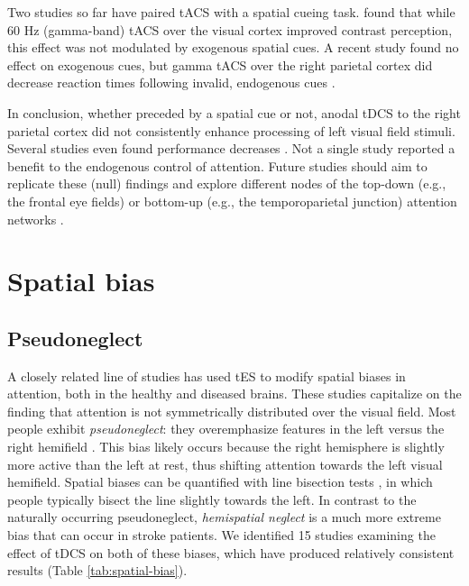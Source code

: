 \documentclass[11pt,]{memoir}
\begin{document}
Two studies so far have paired tACS with a spatial cueing task. \textcite{Laczo2012} found that while 60 Hz (gamma-band) tACS over the visual cortex improved contrast perception, this effect was not modulated by exogenous spatial cues. A recent study found no effect on exogenous cues, but gamma tACS over the right parietal cortex did decrease reaction times following invalid, endogenous cues \autocite{Hopfinger2016}.

In conclusion, whether preceded by a spatial cue or not, anodal tDCS to the right parietal cortex did not consistently enhance processing of left visual field stimuli. Several studies even found performance decreases \autocites{Filmer2015}{Learmonth2015}. Not a single study reported a benefit to the endogenous control of attention. Future studies should aim to replicate these (null) findings and explore different nodes of the top-down (e.g., the frontal eye fields) or bottom-up (e.g., the temporoparietal junction) attention networks \autocite{Corbetta2002}.

\hypertarget{spatial-bias}{%
\section{Spatial bias}\label{spatial-bias}}

\hypertarget{pseudoneglect}{%
\subsection{Pseudoneglect}\label{pseudoneglect}}

A closely related line of studies has used tES to modify spatial biases in attention, both in the healthy and diseased brains. These studies capitalize on the finding that attention is not symmetrically distributed over the visual field. Most people exhibit \emph{pseudoneglect}: they overemphasize features in the left versus the right hemifield \autocite{Jewell2000}. This bias likely occurs because the right hemisphere is slightly more active than the left at rest, thus shifting attention towards the left visual hemifield. Spatial biases can be quantified with line bisection tests \autocite{Bowers1980}, in which people typically bisect the line slightly towards the left. In contrast to the naturally occurring pseudoneglect, \emph{hemispatial neglect} is a much more extreme bias that can occur in stroke patients. We identified 15 studies examining the effect of tDCS on both of these biases, which have produced relatively consistent results (Table \ref{tab:spatial-bias}).
\end{document}
